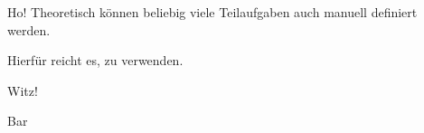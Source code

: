 \documentclass{sp-exam}
\date{12. März 2024}
\begin{document}
   \maketitle

   
   

   \begin{Exercise}{Ho!}
      Theoretisch können beliebig viele Teilaufgaben auch manuell definiert werden.

      Hierfür reicht es, \string\Subtask\space zu verwenden.
   \end{Exercise}

   \begin{Exercise}[1]{Witz!}
   \end{Exercise}
   \appendix
   Bar
\end{document}
